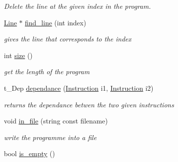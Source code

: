 \begin{DoxyCompactItemize}
\begin{DoxyCompactList}\small\item\em Delete the line at the given index in the program. \item\end{DoxyCompactList}\item 
\hypertarget{classProgram_ae897b48e1e1be99578440eb6a38a3a0d}{
\hyperlink{classLine}{Line} $\ast$ \hyperlink{classProgram_ae897b48e1e1be99578440eb6a38a3a0d}{find\_\-line} (int index)}
\label{classProgram_ae897b48e1e1be99578440eb6a38a3a0d}

\begin{DoxyCompactList}\small\item\em gives the line that corresponds to the index \item\end{DoxyCompactList}\item 
\hypertarget{classProgram_a190f24ecadca14d748408c352aabc219}{
int \hyperlink{classProgram_a190f24ecadca14d748408c352aabc219}{size} ()}
\label{classProgram_a190f24ecadca14d748408c352aabc219}

\begin{DoxyCompactList}\small\item\em get the length of the program \item\end{DoxyCompactList}\item 
t\_\-Dep \hyperlink{classProgram_a9626cf3dd2cd7851fb28d84fd6632f52}{dependance} (\hyperlink{classInstruction}{Instruction} i1, \hyperlink{classInstruction}{Instruction} i2)
\begin{DoxyCompactList}\small\item\em returns the dependance betwen the two given instructions \item\end{DoxyCompactList}\item 
\hypertarget{classProgram_a3db3e17c96bb809c3e6f81b8bc22ee20}{
void \hyperlink{classProgram_a3db3e17c96bb809c3e6f81b8bc22ee20}{in\_\-file} (string const filename)}
\label{classProgram_a3db3e17c96bb809c3e6f81b8bc22ee20}

\begin{DoxyCompactList}\small\item\em write the programme into a file \item\end{DoxyCompactList}\item 
\hypertarget{classProgram_aff32c461ae544453df5d55f475b3da22}{
bool \hyperlink{classProgram_aff32c461ae544453df5d55f475b3da22}{is\_\-empty} ()}
\label{classProgram_aff32c461ae544453df5d55f475b3da22}


\end{DoxyCompactItemize}

